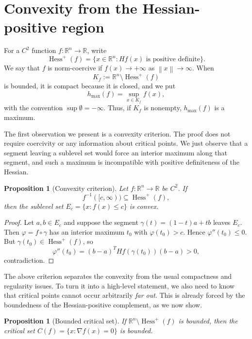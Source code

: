 \documentclass[11pt]{amsart}
\newtheorem{proposition}[theorem]{Proposition}
\theoremstyle{remark}
\newcommand{\Hessp}{\operatorname{Hess}^{+}}
\newcommand{\R}{\mathbb{R}}
\newcommand{\norm}[1]{\left\lVert #1\right\rVert}
\begin{document}
\section{Convexity from the Hessian-positive region}

For a $C^2$ function $f:\R^n\to\R$, write
\[
 \Hessp(f)=\{x\in\R^n : Hf(x) \text{ is positive definite}\}.
\]
We say that $f$ is norm-coercive if $f(x)\to+\infty$ as $\norm{x}\to\infty$.
When
\[
 K_f:=\R^n\setminus\Hessp(f)
\]
is bounded, it is compact because it is closed, and we put
\[
 h_{\max}(f)=\sup_{x\in K_f} f(x),
\]
with the convention $\sup\emptyset=-\infty$. Thus, if $K_f$ is nonempty,
$h_{\max}(f)$ is a maximum.

The first observation we present is a convexity criterion. The proof does not require coercivity or any information about critical points. We just observe that a segment leaving a sublevel set would force an interior maximum along that segment, and such a maximum is incompatible with positive definiteness of the Hessian.

\begin{proposition}[Convexity criterion]\label{prop:convexity-criterion}
Let $f:\R^n\to\R$ be $C^2$. If
\[
 f^{-1}([c,\infty))\subseteq \Hessp(f),
\]
then the sublevel set $E_c=\{x:f(x)\le c\}$ is convex.
\end{proposition}

\begin{proof}
Let $a,b\in E_c$ and suppose the segment $\gamma(t)=(1-t)a+tb$ leaves $E_c$.
Then $\varphi=f\circ\gamma$ has an interior maximum $t_0$ with
$\varphi(t_0)>c$. Hence $\varphi''(t_0)\le0$. But
$\gamma(t_0)\in\Hessp(f)$, so
\[
 \varphi''(t_0)=(b-a)^T Hf(\gamma(t_0))(b-a)>0,
\]
contradiction.
\end{proof}

The above criterion separates the convexity from the usual compactness and regularity issues. To turn it into a high-level statement, we also need to know that critical points cannot occur arbitrarily \textit{far out}. This is already forced by the boundedness of the Hessian-positive complement, as we now show. 

\begin{proposition}[Bounded critical set]\label{prop:bounded-critical-set}
If $\R^n\setminus\Hessp(f)$ is bounded, then the critical set $C(f)=\{x:\nabla f(x)=0\}$ is bounded.
\end{proposition}
\end{document}
